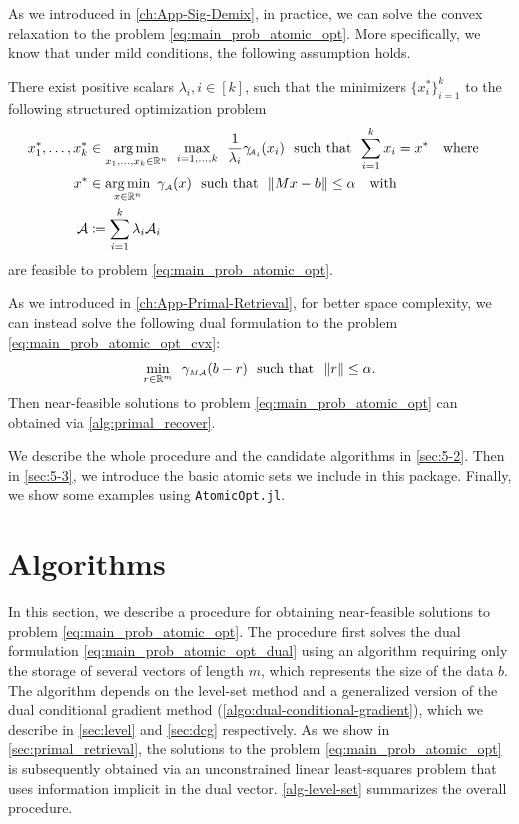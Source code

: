 As we introduced in \autoref{ch:App-Sig-Demix}, in practice, we can solve the convex relaxation to the problem \eqref{eq:main_prob_atomic_opt}. More specifically, we know that under mild conditions, the following assumption holds. 
\begin{assumption} \label{ass:atomic_opt}
There exist positive scalars $\lambda_i, i\in[k]$, such that the minimizers $\{x_i^*\}_{i=1}^k$ to the following structured optimization problem
\begin{equation} \label{eq:main_prob_atomic_opt_cvx} 
  \begin{split}
      x_1^*, \dots, x_k^* &\in \underset{x_1, \dots, x_k \in \mathbb{R}^n}{\textrm{arg}\,{\min}}\enskip \max_{i=1,\dots,k} \enspace \frac{1}{\lambda_i}\gamma_{\!\scriptscriptstyle\mathcal{A}_i}(x_i) \enspace\mathop{\hbox{\rm such that}}\enspace \sum_{i=1}^k x_i = x^* \hbox{\quad where\quad}\\
      x^* &\in \underset{x\in\mathbb{R}^n}{\textrm{arg}\,{\min}}\enskip \gamma_{\scriptscriptstyle\mathcal{A}}(x) \enspace\mathop{\hbox{\rm such that}}\enspace \|Mx- b\| \leq \alpha \hbox{\quad with\quad} \\
      \mathcal{A} &\coloneqq \sum_{i=1}^k \lambda_i\mathcal{A}_i
  \end{split}
\end{equation}
are feasible to problem \eqref{eq:main_prob_atomic_opt}. 
\end{assumption}

As we introduced in \autoref{ch:App-Primal-Retrieval}, for better space complexity, we can instead solve the following dual formulation to the problem \eqref{eq:main_prob_atomic_opt_cvx}:
\begin{equation} \label{eq:main_prob_atomic_opt_dual} 
    \min_{r\in\mathbb{R}^m}\enspace \gamma_{\scriptscriptstyle{M\mathcal{A}}}(b-r) \enspace\mathop{\hbox{\rm such that}}\enspace \|r\| \leq \alpha.
\end{equation}
Then near-feasible solutions to problem \eqref{eq:main_prob_atomic_opt} can obtained via \autoref{alg:primal_recover}. 

We describe the whole procedure and the candidate algorithms in \autoref{sec:5-2}. Then in \autoref{sec:5-3}, we introduce the basic atomic sets we include in this package. Finally, we show some examples using \texttt{AtomicOpt.jl}. 


\section{Algorithms} \label{sec:5-2}

In this section, we describe a procedure for obtaining near-feasible solutions to problem \eqref{eq:main_prob_atomic_opt}. The procedure first solves the dual formulation \eqref{eq:main_prob_atomic_opt_dual} using an algorithm requiring only the storage of several vectors of length $m$, which represents the size of the data $b$. The algorithm depends on the level-set method \cite{berg2011sparse,berg2008probing} and a generalized version of the dual conditional gradient method (\autoref{algo:dual-conditional-gradient}), which we describe in \autoref{sec:level} and \autoref{sec:dcg} respectively. As we show in \autoref{sec:primal_retrieval}, the solutions to the problem \eqref{eq:main_prob_atomic_opt} is subsequently obtained via an unconstrained linear least-squares problem that uses information implicit in the dual vector. \autoref{alg-level-set} summarizes the overall procedure. 

